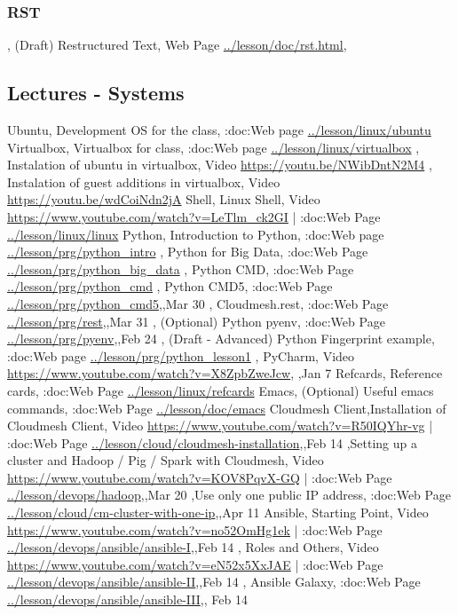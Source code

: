 \subsubsection{RST}
, (Draft) Restructured Text, Web Page \url{../lesson/doc/rst.html},


\subsection{Lectures - Systems}\label{lectures---systems}

Ubuntu, Development OS for the class, :doc:Web page \url{../lesson/linux/ubuntu}
Virtualbox, Virtualbox for class, :doc:Web page \url{../lesson/linux/virtualbox}
  , Instalation of ubuntu in virtualbox, Video \url{https://youtu.be/NWibDntN2M4}
  , Instalation of guest additions in virtualbox, Video \url{https://youtu.be/wdCoiNdn2jA}
Shell, Linux Shell, Video \url{https://www.youtube.com/watch?v=LeTlm_ck2GI} | :doc:Web Page \url{../lesson/linux/linux}
Python, Introduction to Python, :doc:Web page \url{../lesson/prg/python_intro}
      , Python for Big Data, :doc:Web Page \url{../lesson/prg/python_big_data}
      , Python CMD, :doc:Web Page \url{../lesson/prg/python_cmd}
      , Python CMD5, :doc:Web Page \url{../lesson/prg/python_cmd5},,Mar 30
      , Cloudmesh.rest, :doc:Web Page \url{../lesson/prg/rest},,Mar 31     
      , (Optional) Python pyenv, :doc:Web Page \url{../lesson/prg/pyenv},,Feb 24
      , (Draft - Advanced) Python Fingerprint example, :doc:Web page \url{../lesson/prg/python_lesson1}
      , PyCharm, Video \url{https://www.youtube.com/watch?v=X8ZpbZweJcw},      ,Jan 7
Refcards, Reference cards, :doc:Web Page \url{../lesson/linux/refcards}
Emacs, (Optional) Useful emacs commands, :doc:Web Page \url{../lesson/doc/emacs}
Cloudmesh Client,Installation of Cloudmesh Client, Video \url{https://www.youtube.com/watch?v=R50IQYhr-vg} | :doc:Web Page \url{../lesson/cloud/cloudmesh-installation},,Feb 14
	  ,Setting up a cluster and Hadoop / Pig / Spark with Cloudmesh, Video \url{https://www.youtube.com/watch?v=KOV8PqvX-GQ} | :doc:Web Page \url{../lesson/devops/hadoop},,Mar 20
    ,Use only one public IP address, :doc:Web Page \url{../lesson/cloud/cm-cluster-with-one-ip},,Apr 11
Ansible, Starting Point, Video \url{https://www.youtube.com/watch?v=no52OmHg1ek} | :doc:Web Page \url{../lesson/devops/ansible/ansible-I},,Feb 14
       , Roles and Others, Video \url{https://www.youtube.com/watch?v=eN52x5XxJAE} | :doc:Web Page \url{../lesson/devops/ansible/ansible-II},,Feb 14
       , Ansible Galaxy, :doc:Web Page \url{../lesson/devops/ansible/ansible-III},, Feb 14


